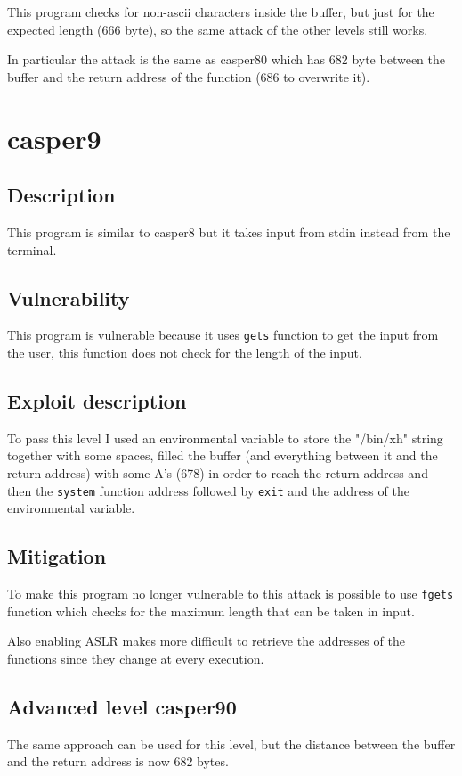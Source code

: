 \documentclass[a4paper,12pt]{article}
\begin{document}
This program checks for non-ascii characters inside the buffer, but just for the expected length (666 byte), so the same attack of the other levels still works.

In particular the attack is the same as casper80 which has 682 byte between the buffer and the return address of the function (686 to overwrite it).

\section{casper9}
\subsection{Description}
This program is similar to casper8 but it takes input from stdin instead from the terminal.

\subsection{Vulnerability}
This program is vulnerable because it uses \texttt{gets} function to get the input from the user, this function does not check for the length of the input.

\subsection{Exploit description}

To pass this level I used an environmental variable to store the "/bin/xh" string together with some spaces, filled the buffer (and everything between it and the return address) with some A's (678) in order to reach the return address and then the \texttt{system} function address followed by \texttt{exit} and the address of the environmental variable.

\subsection{Mitigation}
To make this program no longer vulnerable to this attack is possible to use \texttt{fgets} function which checks for the maximum length that can be taken in input.

Also enabling ASLR makes more difficult to retrieve the addresses of the functions since they change at every execution.


\subsection{Advanced level casper90}
The same approach can be used for this level, but the distance between the buffer and the return address is now 682 bytes.
\end{document}
